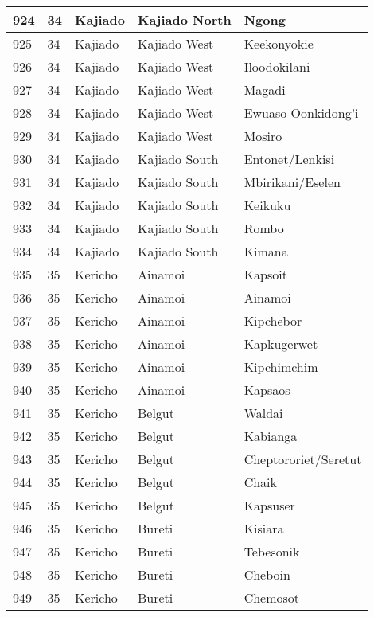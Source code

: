 \begin{table}[!ht]
\begin{tabular}{|l|l|l|l|l|}
        924 & 34 & Kajiado & Kajiado North & Ngong \\ \hline
        925 & 34 & Kajiado & Kajiado West & Keekonyokie \\ \hline
        926 & 34 & Kajiado & Kajiado West & Iloodokilani \\ \hline
        927 & 34 & Kajiado & Kajiado West & Magadi \\ \hline
        928 & 34 & Kajiado & Kajiado West & Ewuaso Oonkidong’i \\ \hline
        929 & 34 & Kajiado & Kajiado West & Mosiro \\ \hline
        930 & 34 & Kajiado & Kajiado South & Entonet/Lenkisi \\ \hline
        931 & 34 & Kajiado & Kajiado South & Mbirikani/Eselen \\ \hline
        932 & 34 & Kajiado & Kajiado South & Keikuku \\ \hline
        933 & 34 & Kajiado & Kajiado South & Rombo \\ \hline
        934 & 34 & Kajiado & Kajiado South & Kimana \\ \hline
        935 & 35 & Kericho & Ainamoi & Kapsoit \\ \hline
        936 & 35 & Kericho & Ainamoi & Ainamoi \\ \hline
        937 & 35 & Kericho & Ainamoi & Kipchebor \\ \hline
        938 & 35 & Kericho & Ainamoi & Kapkugerwet \\ \hline
        939 & 35 & Kericho & Ainamoi & Kipchimchim \\ \hline
        940 & 35 & Kericho & Ainamoi & Kapsaos \\ \hline
        941 & 35 & Kericho & Belgut & Waldai \\ \hline
        942 & 35 & Kericho & Belgut & Kabianga \\ \hline
        943 & 35 & Kericho & Belgut & Cheptororiet/Seretut \\ \hline
        944 & 35 & Kericho & Belgut & Chaik \\ \hline
        945 & 35 & Kericho & Belgut & Kapsuser \\ \hline
        946 & 35 & Kericho & Bureti & Kisiara \\ \hline
        947 & 35 & Kericho & Bureti & Tebesonik \\ \hline
        948 & 35 & Kericho & Bureti & Cheboin \\ \hline
        949 & 35 & Kericho & Bureti & Chemosot \\ \hline

\end{tabular}
\end{table}
